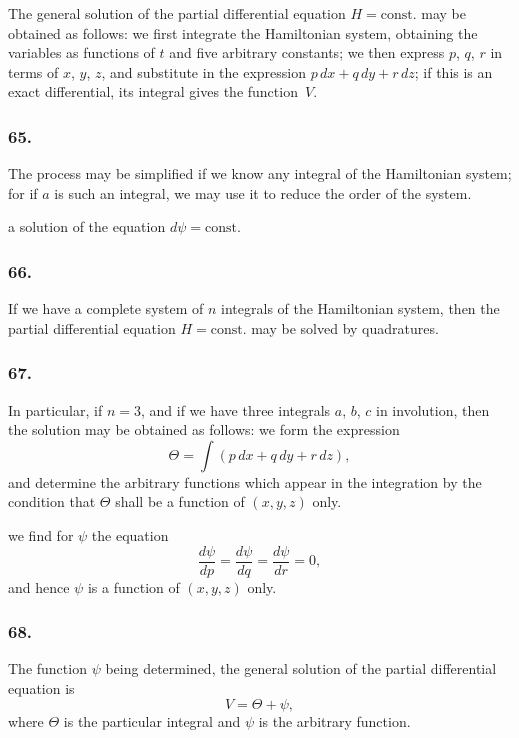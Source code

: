 \documentclass[12pt,a4paper]{article}
\theoremstyle{plain}
\begin{document}
The general solution of the partial differential equation $H = \text{const.}$ may be obtained as follows: we first integrate the Hamiltonian system, obtaining the variables as functions of $t$ and five arbitrary constants; we then express $p$, $q$, $r$ in terms of $x$, $y$, $z$, and substitute in the expression $p\,dx + q\,dy + r\,dz$; if this is an exact differential, its integral gives the function~$V$.

\subsubsection*{65.}

The process may be simplified if we know any integral of the Hamiltonian system; for if $a$ is such an integral, we may use it to reduce the order of the system.

\newpage
\setcounter{page}{142}

a solution of the equation $d\psi = \text{const.}$

\subsubsection*{66.}

If we have a complete system of $n$ integrals of the Hamiltonian system, then the partial differential equation $H = \text{const.}$ may be solved by quadratures.

\subsubsection*{67.}

In particular, if $n = 3$, and if we have three integrals $a$, $b$, $c$ in involution, then the solution may be obtained as follows: we form the expression
\[
\Theta = \int(p\,dx + q\,dy + r\,dz),
\]
and determine the arbitrary functions which appear in the integration by the condition that $\Theta$ shall be a function of $(x, y, z)$ only.

\newpage
\setcounter{page}{143}

we find for $\psi$ the equation
\[
\frac{d\psi}{dp} = \frac{d\psi}{dq} = \frac{d\psi}{dr} = 0,
\]
and hence $\psi$ is a function of $(x, y, z)$ only.

\subsubsection*{68.}

The function $\psi$ being determined, the general solution of the partial differential equation is
\[
V = \Theta + \psi,
\]
where $\Theta$ is the particular integral and $\psi$ is the arbitrary function.
\end{document}
